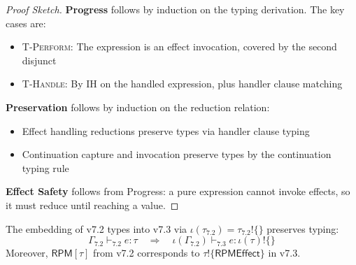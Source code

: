 \begin{proof}[Proof Sketch]
\textbf{Progress} follows by induction on the typing derivation. The key cases are:
\begin{itemize}
  \item \textsc{T-Perform}: The expression is an effect invocation, covered by the second disjunct
  \item \textsc{T-Handle}: By IH on the handled expression, plus handler clause matching
\end{itemize}

\textbf{Preservation} follows by induction on the reduction relation:
\begin{itemize}
  \item Effect handling reductions preserve types via handler clause typing
  \item Continuation capture and invocation preserve types by the continuation typing rule
\end{itemize}

\textbf{Effect Safety} follows from Progress: a pure expression cannot invoke effects, so it must reduce until reaching a value.
\end{proof}

\begin{theorem}
\label{thm:v72-embedding}
The embedding of v7.2 types into v7.3 via $\iota(\tau_{7.2}) = \tau_{7.2} \mathbin{!} \{\}$ preserves typing:
\[
\Gamma_{7.2} \vdash_{7.2} e : \tau \quad \Longrightarrow \quad \iota(\Gamma_{7.2}) \vdash_{7.3} e : \iota(\tau) \mathbin{!} \{\}
\]
Moreover, $\mathsf{RPM}[\tau]$ from v7.2 corresponds to $\tau \mathbin{!} \{\mathsf{RPMEffect}\}$ in v7.3.
\end{theorem}

